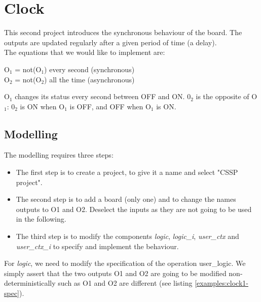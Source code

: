 \chapter{Clock}

This second project introduces the synchronous behaviour of the board. The outputs are updated regularly after a given period of time (a delay).\\
The equations that we would like to implement are:
\begin{center}
O$_1$ = not(O$_1$) every second (synchronous)\\
O$_2$ = not(O$_2$) all the time (asynchronous) 
\end{center}
O$_1$ changes its status every second between OFF and ON. 0$_2$ is the opposite of O$_1$: 0$_2$ is ON when O$_1$ is OFF, and OFF when O$_1$ is ON.

\section{Modelling}

The modelling requires three steps:
\begin{itemize}
    \item The first step is to create a project, to give it a name and select "CSSP project".
    \item The second step is to add a board (only one) and to change the names outputs to O1 and O2. Deselect the inputs as they are not going to be used in the following.
    \item The third step is to modify the components \textit{logic}, \textit{logic\_i}, \textit{user\_ctx} and \textit{user\_ctx\_i} to specify and implement the behaviour. 
\end{itemize}
 


For \textit{logic}, we need to modify the specification of the operation user\_logic. We simply assert that the two outputs O1 and O2 are going to be modified non-deterministically such as  O1 and O2 are different (see listing \ref{examples:clock1-spec}). 



